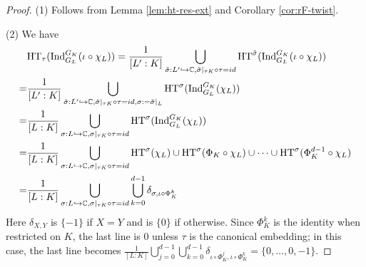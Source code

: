 \documentclass[10pt,a4paper,twoside]{article}
\begin{document}
\begin{appendix}
\begin{proof}
(1)
Follows from Lemma \ref{lem:ht-res-ext} and Corollary \ref{cor:rF-twist}.

(2) We have
\begin{align*}
&{\operatorname{HT}}_{\tau}(\operatorname{Ind}_{G_L}^{G_K}(\iota\circ \chi_L)) =
\frac{1}{[L':K]}\bigcup_{\tilde \sigma: L'\hookrightarrow {\mathbb{C}}, \tilde \sigma|_{\tau K}\circ \tau = id}
{\operatorname{HT}}^{\tilde \sigma}(\operatorname{Ind}_{G_L}^{G_K}(\iota\circ \chi_L))\nonumber\\
 = &
\frac{1}{[L':K]}\bigcup_{\tilde \sigma: L'\hookrightarrow {\mathbb{C}}, \tilde \sigma|_{\tau K}\circ \tau = id,
\sigma := \tilde \sigma|_L}
{\operatorname{HT}}^{\sigma}(\operatorname{Ind}_{G_L}^{G_K}( \chi_L))\nonumber\\
 = &
\frac{1}{[L:K]}\bigcup_{\sigma: L\hookrightarrow {\mathbb{C}}, \sigma|_{\tau K}\circ \tau = id}
{\operatorname{HT}}^{ \sigma}(\operatorname{Ind}_{G_L}^{G_K}(\chi_L))\nonumber\\
 = &
\frac{1}{[L:K]}\bigcup_{\sigma: L\hookrightarrow {\mathbb{C}}, \sigma|_{\tau K}\circ \tau = id}
{\operatorname{HT}}^{\sigma}(\chi_L) \cup {\operatorname{HT}}^{\sigma}(\Phi_K\circ \chi_L) \cup \dots \cup {\operatorname{HT}}^{\sigma}(\Phi_K^{d-1}\circ\chi_L)\nonumber\\
 = &
\frac{1}{[L:K]}\bigcup_{\sigma: L\hookrightarrow {\mathbb{C}}, \sigma|_{\tau K}\circ \tau = id}
\bigcup_{k = 0}^{d-1}
\delta_{\sigma, \iota\circ \Phi_K^k}\nonumber
\end{align*}
Here $\delta_{X, Y}$ is $\{-1\}$ if $X=Y$ and is $\{0\}$ if otherwise.
Since $\Phi^k_K$ is the identity when restricted on $K$,
the last line is $0$ unless $\tau$ is the canonical embedding;
in this case, the last line becomes
$
\frac{1}{[L:K]}\bigcup_{j = 0}^{d-1}
\bigcup_{k = 0}^{d-1}
\delta_{\iota\circ\Phi_K^j, \iota\circ \Phi_K^k} = \{0, \dots, 0, -1\}
$.
\end{proof}



\end{appendix}
\end{document}
